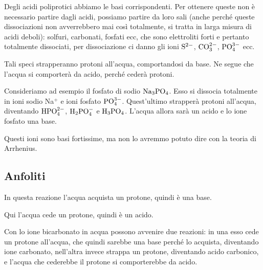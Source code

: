 Degli acidi poliprotici abbiamo le basi corrispondenti. Per ottenere queste non è necessario partire dagli acidi, possiamo partire da loro sali (anche perché queste dissociazioni non avverrebbero mai così totalmente, si tratta in larga misura di acidi deboli): solfuri, carbonati, fosfati ecc, che sono elettroliti forti e pertanto totalmente dissociati, per dissociazione ci danno gli ioni $\rm S^{2-}$, $\rm CO_3^{2-}$, $\rm PO_4^{3-}$ ecc.

Tali speci strapperanno protoni all'acqua, comportandosi da base. Ne segue che l'acqua si comporterà da acido, perché cederà protoni.

\vspace{0.2cm}Consideriamo ad esempio il fosfato di sodio $\rm Na_3PO_4$. Esso si dissocia totalmente in ioni sodio Na$^+$ e ioni fosfato $\rm PO_4^{3-}$. Quest'ultimo strapperà protoni all'acqua, diventando $\rm HPO_4^{2-}$, $\rm H_2PO_4^-$ e $\rm H_3PO_4$. L'acqua allora sarà un acido e lo ione fosfato una base.

Questi ioni sono basi fortissime, ma non lo avremmo potuto dire con la teoria di Arrhenius.
\subsection{Anfoliti}


\vspace{0.2cm}In questa reazione l'acqua acquista un protone, quindi è una base.

\vspace{0.2cm}

\vspace{0.2cm}Qui l'acqua cede un protone, quindi è un acido.

\vspace{0.2cm}

\vspace{0.2cm}

\vspace{0.2cm}Con lo ione bicarbonato in acqua possono avvenire due reazioni: in una esso cede un protone all'acqua, che quindi sarebbe una base perché lo acquista, diventando ione carbonato, nell'altra invece strappa un protone, diventando acido carbonico, e l'acqua che cederebbe il protone si comporterebbe da acido.


